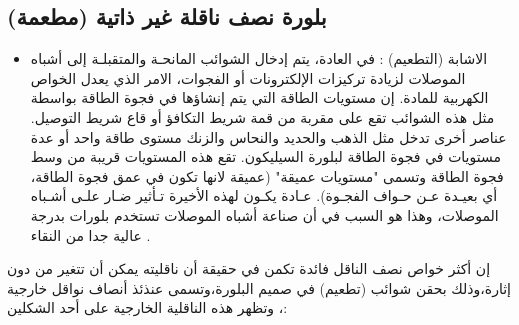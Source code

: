 	\subsection{  بلورة نصف ناقلة غير ذاتية (مطعمة)} 
	\begin{itemize}
		\item الاشابة (التطعيم) : 
		في العادة، يتم إدخال الشوائب المانحـة والمتقبلـة إلى أشباه الموصلات لزيادة تركيزات الإلكترونات أو الفجوات، الامر الذي يعدل الخواص الكهربية للمادة. إن مستويات الطاقة التي يتم إنشاؤها في فجوة الطاقة بواسطة مثل هذه الشوائب تقع على مقربة من قمة شريط التكافؤ أو قاع شريط التوصيل. عناصر أخرى تدخل مثل الذهب والحديد والنحاس والزنك مستوى طاقة واحد أو عدة مستويات في فجوة الطاقة لبلورة السيليكون. تقع هذه المستويات قريبة من وسط فجوة الطاقة وتسمى "مستويات عميقة" (عميقة لانها تكون في عمق فجوة الطاقة، أي بعيـدة عـن حـواف الفجـوة). عـادة يكـون لهذه الأخيرة تـأثير ضـار علـى أشـباه الموصلات، وهذا هو السبب في أن صناعة أشباه الموصلات تستخدم بلورات بدرجة عالية جدا من النقاء . \cite{a7}
		
	\end{itemize}
	إن أكثر خواص نصف الناقل فائدة تكمن في حقيقة أن ناقليته يمكن أن تتغير من دون إثارة،وذلك بحقن شوائب (تطعيم) في صميم البلورة،وتسمى عنذئذ أنصاف نواقل خارجية ، وتظهر هذه الناقلية الخارجية على أحد الشكلين:
 
